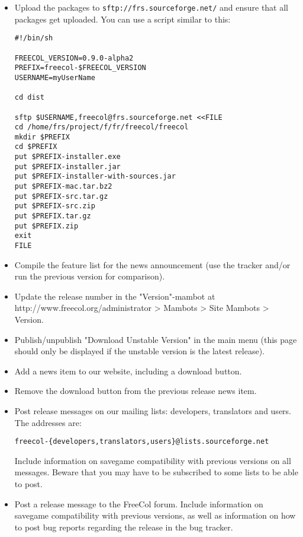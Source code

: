 \documentclass[12pt]{book}
\begin{document}
\begin{itemize}
\item Upload the packages to \verb$sftp://frs.sourceforge.net/$ and ensure that
  all packages get uploaded. You can use a script similar to this:

\begin{verbatim}
#!/bin/sh

FREECOL_VERSION=0.9.0-alpha2
PREFIX=freecol-$FREECOL_VERSION
USERNAME=myUserName

cd dist

sftp $USERNAME,freecol@frs.sourceforge.net <<FILE
cd /home/frs/project/f/fr/freecol/freecol
mkdir $PREFIX
cd $PREFIX
put $PREFIX-installer.exe
put $PREFIX-installer.jar
put $PREFIX-installer-with-sources.jar
put $PREFIX-mac.tar.bz2
put $PREFIX-src.tar.gz
put $PREFIX-src.zip
put $PREFIX.tar.gz
put $PREFIX.zip
exit
FILE
\end{verbatim}

\item Compile the feature list for the news announcement (use the tracker
  and/or run the previous version for comparison).

\item Update the release number in the "Version"-mambot at
  http://www.freecol.org/administrator > Mambots > Site Mambots > Version.

\item Publish/unpublish "Download Unstable Version" in the main menu
  (this page should only be displayed if the unstable version is the
  latest release).

\item Add a news item to our website, including a download button.

\item Remove the download button from the previous release news item.

\item Post release messages on our mailing lists: developers,
  translators and users.  The addresses are:

\verb+freecol-{developers,translators,users}@lists.sourceforge.net+

Include information on savegame compatibility with previous versions
on all messages.  Beware that you may have to be subscribed to some
lists to be able to post.

\item Post a release message to the FreeCol forum. Include information
  on savegame compatibility with previous versions, as well as
  information on how to post bug reports regarding the release in the
  bug tracker.

\end{itemize}
\end{document}
